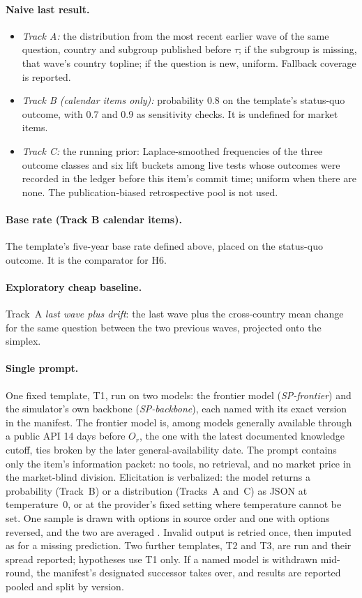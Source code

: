 \documentclass[11pt]{article}
\begin{document}
\paragraph{Naive last result.}
\begin{itemize}
  \item \emph{Track A:} the distribution from the most recent earlier wave of the same question, country and subgroup published before $\tau$; if the subgroup is missing, that wave's country topline; if the question is new, uniform. Fallback coverage is reported.
  \item \emph{Track B (calendar items only):} probability 0.8 on the template's status-quo outcome, with 0.7 and 0.9 as sensitivity checks. It is undefined for market items.
  \item \emph{Track C:} the running prior: Laplace-smoothed frequencies of the three outcome classes and six lift buckets among live tests whose outcomes were recorded in the ledger before this item's commit time; uniform when there are none. The publication-biased retrospective pool is not used.
\end{itemize}

\paragraph{Base rate (Track B calendar items).} The template's five-year base rate defined above, placed on the status-quo outcome. It is the comparator for H6.

\paragraph{Exploratory cheap baseline.} Track~A \emph{last wave plus drift}: the last wave plus the cross-country mean change for the same question between the two previous waves, projected onto the simplex.

\paragraph{Single prompt.} One fixed template, T1, run on two models: the frontier model (\emph{SP-frontier}) and the simulator's own backbone (\emph{SP-backbone}), each named with its exact version in the manifest. The frontier model is, among models generally available through a public API 14 days before $O_r$, the one with the latest documented knowledge cutoff, ties broken by the later general-availability date. The prompt contains only the item's information packet: no tools, no retrieval, and no market price in the market-blind division. Elicitation is verbalized: the model returns a probability (Track~B) or a distribution (Tracks~A and~C) as JSON at temperature~0, or at the provider's fixed setting where temperature cannot be set. One sample is drawn with options in source order and one with options reversed, and the two are averaged \citep{dominguezolmedo2023questioning}. Invalid output is retried once, then imputed as for a missing prediction. Two further templates, T2 and T3, are run and their spread reported; hypotheses use T1 only. If a named model is withdrawn mid-round, the manifest's designated successor takes over, and results are reported pooled and split by version.
\end{document}
